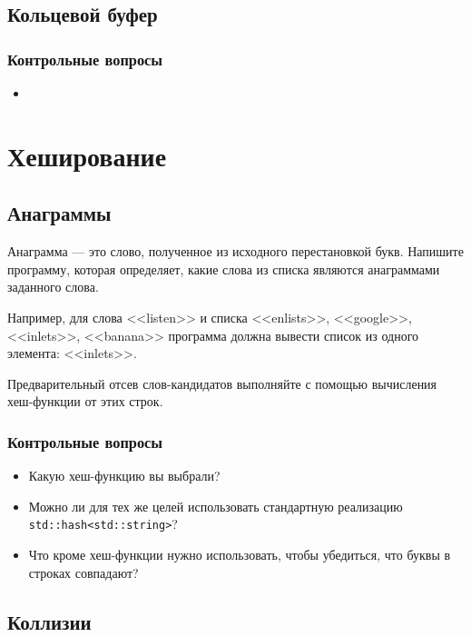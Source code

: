 \documentclass[10pt,twoside,openany]{book}
\begin{document}
\section{Кольцевой буфер}

\subsection*{Контрольные вопросы}

\begin{itemize}
    \item
\end{itemize}

\chapter{Хеширование}

\section{Анаграммы}

Анаграмма --- это слово, полученное из исходного перестановкой букв.
Напишите программу, которая определяет, какие слова из списка являются анаграммами
заданного слова.

Например, для слова <<listen>> и списка <<enlists>>, <<google>>, <<inlets>>, <<banana>>
программа должна вывести список из одного элемента: <<inlets>>.

Предварительный отсев слов-кандидатов выполняйте с помощью вычисления
хеш-функции от этих строк.

\subsection*{Контрольные вопросы}

\begin{itemize}
    \item Какую хеш-функцию вы выбрали?
    \item Можно ли для тех же целей использовать стандартную
          реализацию {\tt std::hash<std::string>}?
    \item Что кроме хеш-функции нужно использовать, чтобы убедиться, что буквы в строках совпадают?
\end{itemize}

\section{Коллизии}
\end{document}

